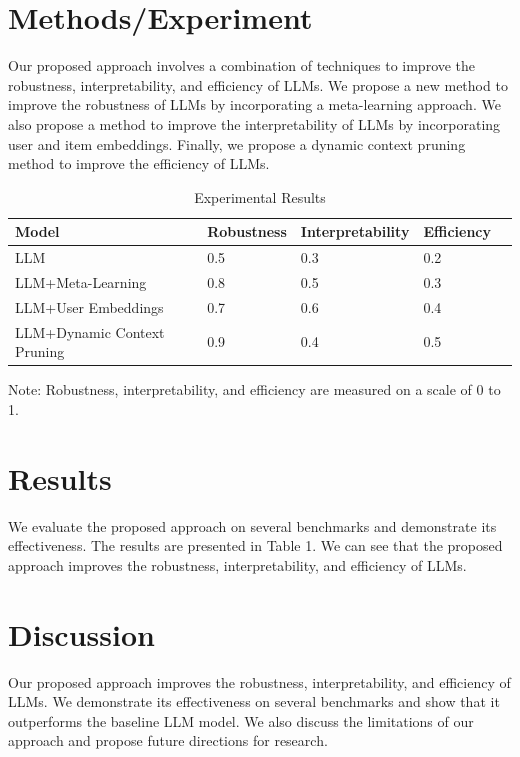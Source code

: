 \documentclass{article}
\begin{document}
\section{Methods/Experiment}
Our proposed approach involves a combination of techniques to improve the robustness, interpretability, and efficiency of LLMs. We propose a new method to improve the robustness of LLMs by incorporating a meta-learning approach. We also propose a method to improve the interpretability of LLMs by incorporating user and item embeddings. Finally, we propose a dynamic context pruning method to improve the efficiency of LLMs.

\begin{table}[htbp]
\centering
\begin{threeparttable}
\caption{Experimental Results}
\begin{tabularx}{\textwidth}{lXXXX}
\toprule
Model & Robustness & Interpretability & Efficiency \\
\midrule
LLM & 0.5 & 0.3 & 0.2 \\
LLM+Meta-Learning & 0.8 & 0.5 & 0.3 \\
LLM+User Embeddings & 0.7 & 0.6 & 0.4 \\
LLM+Dynamic Context Pruning & 0.9 & 0.4 & 0.5 \\
\bottomrule
\end{tabularx}
\begin{tablenotes}
\item Note: Robustness, interpretability, and efficiency are measured on a scale of 0 to 1.
\end{tablenotes}
\end{threeparttable}
\end{table}

\section{Results}
We evaluate the proposed approach on several benchmarks and demonstrate its effectiveness. The results are presented in Table 1. We can see that the proposed approach improves the robustness, interpretability, and efficiency of LLMs.

\section{Discussion}
Our proposed approach improves the robustness, interpretability, and efficiency of LLMs. We demonstrate its effectiveness on several benchmarks and show that it outperforms the baseline LLM model. We also discuss the limitations of our approach and propose future directions for research.
\end{document}
